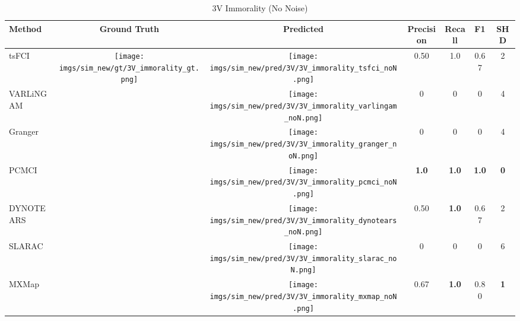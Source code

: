 \begin{table}[htb]
\begin{tabular}{l|c|c|c|c|c|c}
Method    & Ground Truth      & Predicted & Precision    & Recall       & F1           & SHD        \\ \hline
tsFCI     & \multirow{7}{*}[-9.5em]{\begin{minipage}{.17\linewidth} \centering \texttt{[image: imgs/sim\_new/gt/3V\_immorality\_gt.png]} \end{minipage}} & \begin{minipage}{.17\linewidth} \centering \texttt{[image: imgs/sim\_new/pred/3V/3V\_immorality\_tsfci\_noN.png]} \end{minipage}          & 0.50         & 1.0          & 0.67         & 2          \\
VARLiNGAM &                   & \begin{minipage}{.17\linewidth} \centering \texttt{[image: imgs/sim\_new/pred/3V/3V\_immorality\_varlingam\_noN.png]} \end{minipage}  & 0            & 0            & 0            & 4          \\
Granger   &                   & \begin{minipage}{.17\linewidth} \centering \texttt{[image: imgs/sim\_new/pred/3V/3V\_immorality\_granger\_noN.png]} \end{minipage}  & 0            & 0            & 0            & 4          \\
PCMCI     &                   & \begin{minipage}{.17\linewidth} \centering \texttt{[image: imgs/sim\_new/pred/3V/3V\_immorality\_pcmci\_noN.png]} \end{minipage}  & \textbf{1.0} & \textbf{1.0} & \textbf{1.0} & \textbf{0} \\
DYNOTEARS &                   & \begin{minipage}{.17\linewidth} \centering \texttt{[image: imgs/sim\_new/pred/3V/3V\_immorality\_dynotears\_noN.png]} \end{minipage}  & 0.50         & \textbf{1.0} & 0.67         & 2          \\
SLARAC    &                   & \begin{minipage}{.17\linewidth} \centering \texttt{[image: imgs/sim\_new/pred/3V/3V\_immorality\_slarac\_noN.png]} \end{minipage}  & 0            & 0            & 0            & 6          \\ \cline{1-1} \cline{3-7} 
MXMap     &                   & \begin{minipage}{.17\linewidth} \centering \texttt{[image: imgs/sim\_new/pred/3V/3V\_immorality\_mxmap\_noN.png]} \end{minipage}  & 0.67         & \textbf{1.0} & 0.80         & \textbf{1}
\end{tabular}
\caption{3V Immorality (No Noise)}
\label{tab:3V_immo_noN}
\end{table}

